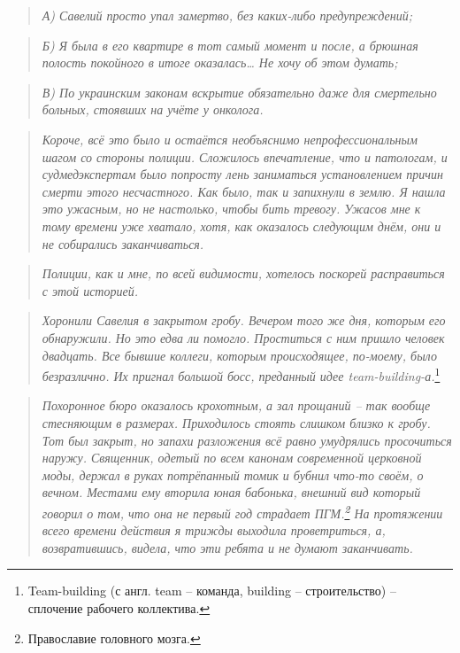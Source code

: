 \documentclass[
  a5paperpaper,
  DIV=11,
  numbers=noendperiod]{scrreprt}
\begin{document}
\begin{quote}
\emph{А) Савелий просто упал замертво, без каких-либо предупреждений;}
\end{quote}

\begin{quote}
\emph{Б) Я была в его квартире в тот самый момент и после, а брюшная
полость покойного в итоге оказалась\ldots{} Не хочу об этом думать;}
\end{quote}

\begin{quote}
\emph{В) По украинским законам вскрытие обязательно даже для смертельно
больных, стоявших на учёте у онколога.}
\end{quote}

\begin{quote}
\emph{Короче, всё это было и остаётся необъяснимо непрофессиональным
шагом со стороны полиции. Сложилось впечатление, что и патологам, и
судмедэкспертам было попросту лень заниматься установлением причин
смерти этого несчастного. Как было, так и запихнули в землю. Я нашла это
ужасным, но не настолько, чтобы бить тревогу. Ужасов мне к тому времени
уже хватало, хотя, как оказалось следующим днём, они и не собирались
заканчиваться.}
\end{quote}

\begin{quote}
\emph{Полиции, как и мне, по всей видимости, хотелось поскорей
расправиться с этой историей.}
\end{quote}

\begin{quote}
\emph{Хоронили Савелия в закрытом гробу. Вечером того же дня, которым
его обнаружили. Но это едва ли помогло. Проститься с ним пришло человек
двадцать. Все бывшие коллеги, которым происходящее, по-моему, было
безразлично. Их пригнал большой босс, преданный идее
team-building-а.}\footnote{Team-building (с англ. team -- команда,
  building -- строительство) -- сплочение рабочего коллектива.}
\end{quote}

\begin{quote}
\emph{Похоронное бюро оказалось крохотным, а зал прощаний -- так вообще
стесняющим в размерах. Приходилось стоять слишком близко к гробу. Тот
был закрыт, но запахи разложения всё равно умудрялись просочиться
наружу. Священник, одетый по всем канонам современной церковной моды,
держал в руках потрёпанный томик и бубнил что-то своём, о вечном.
Местами ему вторила юная бабонька, внешний вид который говорил о том,
что она не первый год страдает ПГМ.\footnote{Православие головного
  мозга.} На протяжении всего времени действия я трижды выходила
проветриться, а, возвратившись, видела, что эти ребята и не думают
заканчивать. }
\end{quote}
\end{document}

